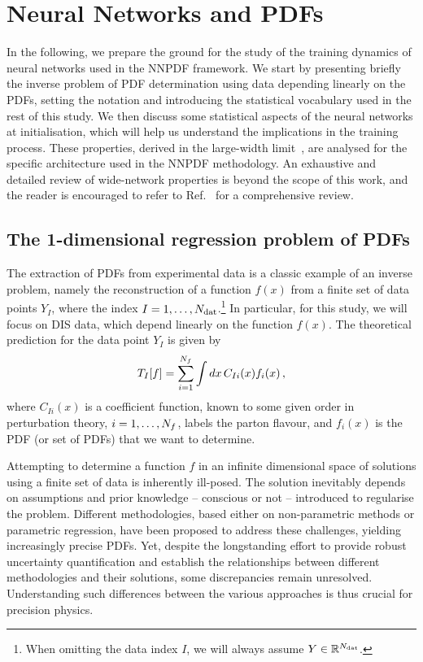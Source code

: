\section{Neural Networks and PDFs}
\label{sec:Init}


In the following, we prepare the ground for the study of the training dynamics
of neural networks used in the NNPDF framework. We start by presenting briefly
the inverse problem of PDF determination using data depending linearly on the PDFs,
setting the notation and introducing the statistical
vocabulary used in the rest of this study. We then discuss some
statistical aspects of the neural networks at initialisation, which will help us
understand the implications in the training process. These properties, derived
in the large-width limit~\cite{lee2019wide,jacot2018neural}, are analysed for the
specific architecture used in the NNPDF methodology. An exhaustive and detailed
review of wide-network properties is beyond the scope of this work, and the
reader is encouraged to refer to Ref.~\cite{Roberts:2021fes} for a comprehensive
review.

\subsection{The 1-dimensional regression problem of PDFs}
\label{subsec:inverse_problem}

The extraction of PDFs from experimental data is a classic example of an inverse
problem, namely the reconstruction of a function $f(x)$ from a finite set of
data points $Y_I$, where the index $I=1, \ldots, N_{\mathrm{dat}}$.\footnote{When omitting
the data index $I$, we will always assume $Y \in \mathbb{R}^{N_{\mathrm{dat}}}$.} In
particular, for this study, we will focus on DIS data, which depend linearly on
the function $f(x)$. The theoretical prediction for the data point $Y_I$ is
given by
\begin{equation}
    \label{eq:TheoryPred}
    T_I[f] = \sum_{i=1}^{N_{f}} \int dx\, C_{Ii}(x) f_{i}(x)\, ,
\end{equation}
where $C_{Ii}(x)$ is a coefficient function, known to some given order in
perturbation theory, $i = 1, \ldots, N_{f}$, labels the parton flavour, 
and $f_i(x)$ is the PDF (or set of PDFs) that we want to determine.

Attempting to determine a function $f$ in an infinite dimensional space of
solutions using a finite set of data is inherently ill-posed. The solution
inevitably depends on assumptions and prior knowledge -- conscious or not --
introduced to regularise the problem. Different methodologies, based either on
non-parametric methods or parametric regression, have been proposed to address
these challenges, yielding increasingly precise PDFs. Yet, despite
the longstanding effort to provide robust uncertainty quantification and
establish the relationships between different methodologies and their solutions,
some discrepancies remain unresolved. Understanding such differences between the
various approaches is thus crucial for precision physics.

